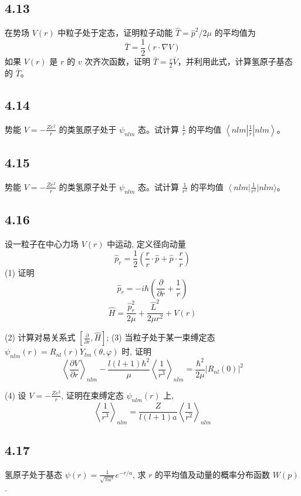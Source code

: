 \subsection{4.13}
在势场 $ V(r) $ 中粒子处于定态，证明粒子动能 $ \hat{T} = \hat{p}^2 / 2\mu $ 的平均值为
$$ \bar{T} = \frac{1}{2}(r \cdot \nabla V) $$
如果 $ V(r) $ 是 $ r $ 的 $ v $ 次齐次函数，证明 $ \bar{T} = \frac{v}{2} \bar{V} $，并利用此式，计算氢原子基态的 $ \bar{T} $。

\subsection{4.14}
势能 $ V = -\frac{Ze^2}{r} $ 的类氢原子处于 $ \psi_{nlm} $ 态。试计算 $ \frac{1}{r} $ 的平均值 $\left\langle nlm | \frac{1}{r} | nlm \right\rangle$。

\subsection{4.15}
势能 $ V = -\frac{Ze^2}{r} $ 的类氢原子处于 $\psi_{nlm}$ 态。试计算 $\frac{1}{r^2}$ 的平均值 $\left\langle nlm \right| \frac{1}{r^2} |nlm\rangle$。

\subsection{4.16}
设一粒子在中心力场 $ V(r) $ 中运动, 定义径向动量
$$ \hat{p}_r = \frac{1}{2} \left( \frac{r}{r} \cdot \hat{p} + \hat{p} \cdot \frac{r}{r} \right) $$
(1) 证明
$$ \hat{p}_r = -i \hbar \left( \frac{\partial}{\partial r} + \frac{1}{r} \right) $$
$$ \hat{H} = \frac{\hat{p}_r^2}{2\mu} + \frac{\hat{L}^2}{2\mu r^2} + V(r) $$

(2) 计算对易关系式 $\left[ \frac{\partial}{\partial r}, \hat{H} \right]$; (3) 当粒子处于某一束缚定态 $\psi_{nlm}(r) = R_{nl}(r)Y_{lm}(\theta, \varphi)$ 时, 证明
$$ \left\langle \frac{\partial V}{\partial r} \right\rangle_{nlm} - \frac{l(l+1)\hbar^2}{\mu} \left\langle \frac{1}{r^3} \right\rangle_{nlm} = \frac{\hbar^2}{2\mu} |R_{nl}(0)|^2 $$

(4) 设 $V = -\frac{Ze^2}{r}$, 证明在束缚定态 $\psi_{nlm}(r)$ 上,
$$ \left\langle \frac{1}{r^3} \right\rangle_{nlm} = \frac{Z}{l(l+1)a} \left\langle \frac{1}{r^2} \right\rangle_{nlm} $$

\subsection{4.17}
氢原子处于基态 $\psi(r) = \frac{1}{\sqrt{\pi a^3}} e^{-r/a}$, 求 $r$ 的平均值及动量的概率分布函数 $W(p)$.

